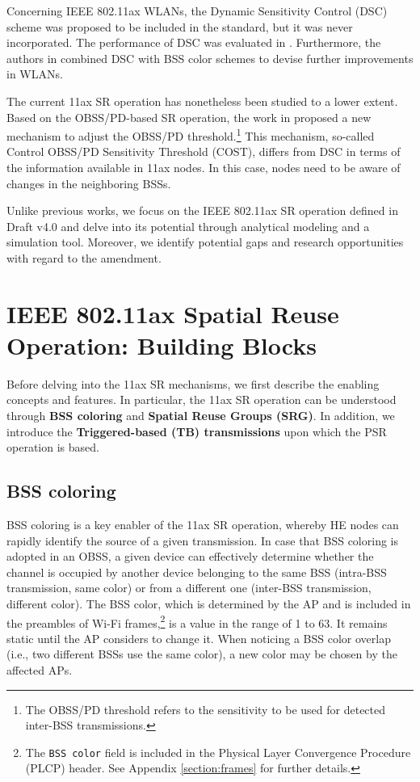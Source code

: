 \documentclass{ieeeaccess}
\begin{document}
Concerning IEEE 802.11ax WLANs, the Dynamic Sensitivity Control (DSC) scheme was proposed to be included in the standard, but it was never incorporated. The performance of DSC was evaluated in \cite{afaqui2015evaluation, afaqui2016dynamic, kulkarni2015taming}. Furthermore, the authors in \cite{selinis2016evaluation, selinis2017exploiting} combined DSC with BSS color schemes to devise further improvements in WLANs.

The current 11ax SR operation has nonetheless been studied to a lower extent. Based on the OBSS/PD-based SR operation, the work in \cite{selinis2018control} proposed a new mechanism to adjust the OBSS/PD threshold.\footnote{The OBSS/PD threshold refers to the sensitivity to be used for detected inter-BSS transmissions.} This mechanism, so-called Control OBSS/PD Sensitivity Threshold (COST), differs from DSC in terms of the information available in 11ax nodes. In this case, nodes need to be aware of changes in the neighboring BSSs. 

Unlike previous works, we focus on the IEEE 802.11ax SR operation defined in Draft v4.0 and delve into its potential through analytical modeling and a simulation tool. Moreover, we identify potential gaps and research opportunities with regard to the amendment.

\section{IEEE 802.11ax Spatial Reuse Operation: Building Blocks}
\label{section:enablers_sr_11ax}
Before delving into the 11ax SR mechanisms, we first describe the enabling concepts and features. In particular, the 11ax SR operation can be understood through \textbf{BSS coloring} and \textbf{Spatial Reuse Groups (SRG)}. In addition, we introduce the \textbf{Triggered-based (TB) transmissions} upon which the PSR operation is based.

\subsection{BSS coloring}	
\label{section:bss_coloring}	
BSS coloring is a key enabler of the 11ax SR operation, whereby HE nodes can rapidly identify the source of a given transmission. In case that BSS coloring is adopted in an OBSS, a given device can effectively determine whether the channel is occupied by another device belonging to the same BSS (intra-BSS transmission, same color) or from a different one (inter-BSS transmission, different color). The BSS color, which is determined by the AP and is included in the preambles of Wi-Fi frames,\footnote{The \texttt{BSS color} field is included in the Physical Layer Convergence Procedure (PLCP) header. See Appendix \ref{section:frames} for further details.} is a value in the range of 1 to 63. It remains static until the AP considers to change it. When noticing a BSS color overlap (i.e., two different BSSs use the same color), a new color may be chosen by the affected APs. 
\end{document}
